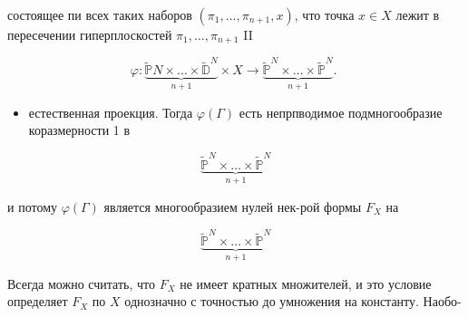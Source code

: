 \documentclass[10pt]{article}
\begin{document}
состоящее пи всех таких наборов $\left(\pi_{1}, \ldots, \pi_{n+1}, x\right)$, что точка $x \in X$ лежит в пересечении гиперплоскостей $\pi_{1}, \ldots, \pi_{n+1}$ II



\[

\varphi: \underbrace{\tilde{\mathbb{P}} N \times \ldots \times \tilde{\mathbb{D}}^{N}}_{n+1} \times X \rightarrow \underbrace{\widetilde{\mathbb{P}}^{N} \times \ldots \times \tilde{\mathbb{P}}^{N}}_{n+1} \text {. }

\]



\begin{itemize}

  \item естественная проекция. Тогда $\varphi(\Gamma)$ есть непрпводимое подмногообразие коразмерности 1 в

\end{itemize}



\[

\underbrace{\tilde{\mathbb{P}}^{N} \times \ldots \times \tilde{\mathbb{P}}^{N}}_{n+1}

\]



и потому $\varphi(\Gamma)$ является многообразием нулей нек-рой формы $F_{X}$ на



\[

\underbrace{\tilde{\mathbb{P}}^{N} \times \ldots \times \tilde{\mathbb{P}}^{N}}_{n+1}

\]



Всегда можно считать, что $F_{X}$ не имеет кратных множителей, и это условие определяет $F_{X}$ по $X$ однозначно с точностью до умножения на константу. Наобо-
\end{document}
